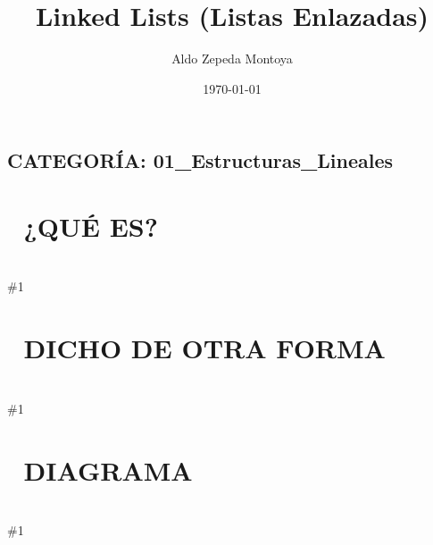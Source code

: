 \documentclass{article}
\newcommand{\quees}[1]{
    \section*{🤔 ¿QUÉ ES?}
    \hrulefill \\
    \#1
}
\newcommand{\dichodeotraforma}[1]{
    \section*{💬 DICHO DE OTRA FORMA}
    \hrulefill \\
    \#1
}
\newcommand{\diagrama}[1]{
    \section*{🎨 DIAGRAMA}
    \hrulefill \\
    \#1
}
\begin{document}
\title{Linked Lists (Listas Enlazadas)}
\author{Aldo Zepeda Montoya}
\date{\today}
\maketitle

\subsection*{CATEGORÍA: 01\_Estructuras\_Lineales}

\quees{
Una cacería del tesoro 🗺️. Cada pista (node) te dice dónde está la 
SIGUIENTE pista. 

No sabes dónde está la pista \#5 sin seguir la cadena desde el inicio: 
pista 1 → pista 2 → pista 3 → pista 4 → pista 5. 

A diferencia de los arrays (vagones pegaditos), los nodos de una 
Linked List pueden estar en cualquier parte de la memoria. Lo único
que los mantiene unidos es que cada uno sabe la dirección (pointer)
del siguiente.
}

\dichodeotraforma{
Una Linked List es una estructura lineal donde los elementos no se
guardan en posiciones contiguas de memoria. Cada elemento es un objeto
llamado "Node", que contiene:
1. El valor (data).
2. Un puntero (next) al siguiente nodo.

Esto permite insertar y eliminar elementos en los extremos en O(1) 
sin tener que desplazar a nadie, pero sacrificas el acceso aleatorio
(no puedes ir directo al índice `i`).
}

\diagrama{\begin{verbatim}
Singly Linked List:
HEAD
 ↓
[3|•]──→[7|•]──→[1|•]──→[9|NULL]
 node0   node1   node2   node3

Doubly Linked List:
HEAD                      TAIL
 ↓                         ↓
[NULL|3|•]⇄[•|7|•]⇄[•|1|•]⇄[•|9|NULL]

Insertar 5 después del node1 (valor 7):
ANTES:   [3]──→[7]──→[1]──→[9]
                ↓
DESPUÉS: [3]──→[7]──→[5]──→[1]──→[9]   ← O(1) si ya tienes el puntero
\end{verbatim}}
\end{document}
